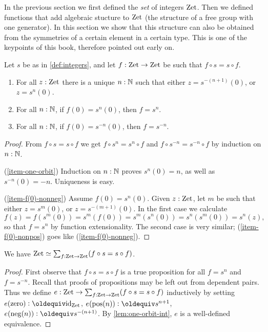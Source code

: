 \documentclass[a4,12pt]{amsart}
\begin{document}
In the previous section we first defined the \emph{set}
of integers $\mathrm{Zet}$. Then we defined functions that add
algebraic stucture to $\mathrm{Zet}$ (the structure of a free group 
with one generator). In this section we
show that this structure can also be obtained from the
symmetries of a certain element in a certain type.
This is one of the keypoints of this book, 
therefore pointed out early on.

\begin{lemma}\label{lem:one-orbit-int}
Let $s$ be as in \cref{def:integers}, and 
let $f:\mathrm{Zet}\to\mathrm{Zet}$ be such that $f\circ s = s\circ f$. 
  \begin{enumerate}
  \item\label{item-one-orbit} For all $z:\mathrm{Zet}$ there is a unique $n:\mathbb{N}$
such that either $z=s^{-(n+1)}(0)$, or $z=s^{n}(0)$.
  \item\label{item-f(0)-nonneg} For all $n:\mathbb{N}$, if $f(0)=s^{n}(0)$, then $f=s^{n}$.
  \item\label{item-f(0)-nonpos} For all $n:\mathbb{N}$, if $f(0)=s^{-n}(0)$, then $f=s^{-n}$.
  \end{enumerate}
\end{lemma}
\begin{proof}
From $f\circ s = s\circ f$ we get $f\circ s^n = s^n\circ f$
and $f\circ s^{-n} = s^{-n}\circ f$ by induction on $n:\mathbb{N}$.

(\ref{item-one-orbit}) Induction on $n:\mathbb{N}$ proves $s^{n}(0)=n$, 
as well as $s^{-n}(0)=-n$. Uniqueness is easy.

(\ref{item-f(0)-nonneg}) Assume $f(0)=s^{n}(0)$.  
Given $z:\mathrm{Zet}$, let $m$ be such that either $z=s^{m}(0)$, 
or $z=s^{-(m+1)}(0)$. In the first case we calculate
\[
f(z)=f(s^{m}(0))=s^{m}(f(0))=s^{m}(s^{n}(0))=s^{n}(s^{m}(0))= s^{n}(z),
\]
so that $f=s^{n}$ by function extensionality. 
The second case is very similar;
(\ref{item-f(0)-nonpos}) goes like (\ref{item-f(0)-nonneg}).
\end{proof}

\begin{corollary}\label{cor:pre-torsor-int}
We have $\mathrm{Zet}\simeq \sum_{f:\mathrm{Zet}\to\mathrm{Zet}} (f\circ s = s\circ f)$.
\end{corollary}
\begin{proof}
First observe that $f\circ s = s\circ f$ is a true proposition
for all $f=s^n$ and $f=s^{-n}$. Recall that proofs of propositions
may be left out from dependent pairs. Thus we
define $e : \mathrm{Zet}\to \sum_{f:\mathrm{Zet}\to\mathrm{Zet}} (f\circ s = s\circ f)$ 
inductively by setting 
$e(\zzero)\defeq \id_\zet$, 
$e(\zpos(n))\defeq s^{n+1}$,
$e(\zneg(n))\defeq s^{-(n+1)}$.
By \cref{lem:one-orbit-int}, $e$ is a well-defined equivalence.
\end{proof}
\end{document}
